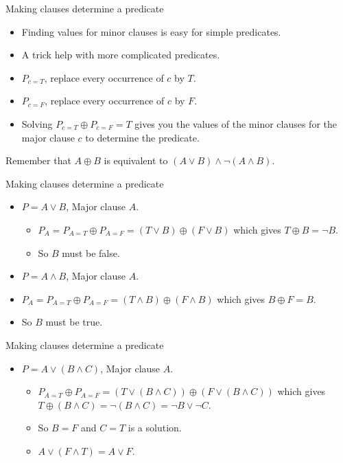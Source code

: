 \documentclass{beamer}
\begin{document}
\begin{frame}{Making clauses determine a predicate}
  \begin{itemize}
  \item Finding values for minor clauses is easy for simple
    predicates.
  \item A trick help with more complicated predicates.
  \item $P_{c=T}$, replace every occurrence of $c$ by $T$.
  \item $P_{c=F}$, replace every occurrence of $c$ by $F$.
  \item Solving $P_{c=T} \oplus P_{c=F} = T$ gives you the
    values of the minor clauses for the major clause $c$ to determine
    the predicate.
  \end{itemize}
Remember that $A\oplus B$ is equivalent to $(A\lor B) \land \neg (A
\land B)$. 
\end{frame}
\begin{frame}{Making clauses determine a predicate}
  \begin{itemize}
  \item $P=A\lor B$, Major clause $A$.
    \begin{itemize}
    \item $P_A = P_{A=T} \oplus P_{A=F} = (T \lor B) \oplus (F
      \lor B)$ which gives $T \oplus B = \neg B$. 
    \item So $B$ must be false.
    \end{itemize}
    \item $P=A\land B$, Major clause $A$.
    \item $P_A = P_{A=T} \oplus P_{A=F} = (T \land B) \oplus (F
      \land B)$ which gives $B \oplus F =  B$. 
    \item So $B$ must be true.
  \end{itemize}
\end{frame}
\begin{frame}{Making clauses determine a predicate}
  \begin{itemize}
  \item $P=A\lor (B\land C)$, Major clause $A$.
    \begin{itemize}
    \item $P_{A=T} \oplus P_{A=F} = (T \lor (B\land C)) \oplus
      (F 
      \lor (B\land C))$ which gives $T\oplus (B\land C) = \neg (B
      \land C) = \neg B \lor \neg C$.
    \item So $B=F$ and $C=T$ is a solution.
    \item $A \lor (F \land T) = A \lor F$. 
    \end{itemize}

  \end{itemize}
\end{frame}
\end{document}
